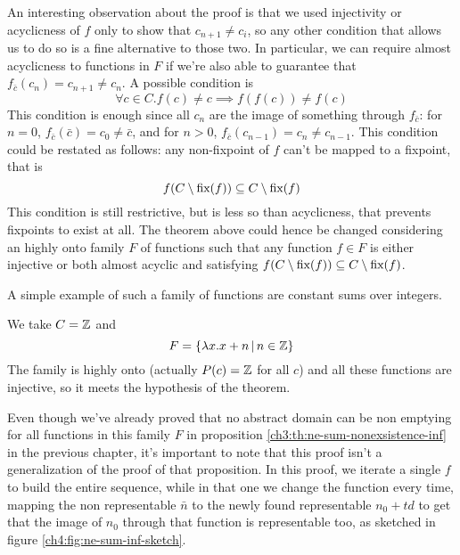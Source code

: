 An interesting observation about the proof is that we used injectivity or acyclicness of $f$ only to show that $c_{n+1} \neq c_i$, so any other condition that allows us to do so is a fine alternative to those two. In particular, we can require almost acyclicness to functions in $F$ if we're also able to guarantee that $f_{\bar{c}}(c_n) = c_{n+1} \neq c_n$. A possible condition is
\[
\forall c \in C. f(c) \neq c \implies f(f(c)) \neq f(c)
\]
This condition is enough since all $c_n$ are the image of something through $f_{\bar{c}}$: for $n = 0$, $f_{\bar{c}}(\bar{c})= c_0 \neq \bar{c}$, and for $n > 0$, $f_{\bar{c}}(c_{n-1}) = c_n \neq c_{n-1}$.
This condition could be restated as follows: any non-fixpoint of $f$ can't be mapped to a fixpoint, that is
\[
f(C \setminus \text{fix}(f)) \subseteq C \setminus \text{fix}(f)
\]
This condition is still restrictive, but is less so than acyclicness, that prevents fixpoints to exist at all.
The theorem above could hence be changed considering an highly onto family $F$ of functions such that any function $f \in F$ is either injective or both almost acyclic and satisfying $f(C \setminus \text{fix}(f)) \subseteq C \setminus \text{fix}(f)$.

A simple example of such a family of functions are constant sums over integers.
\begin{example}
We take $C = \mathbb{Z}$ and
\[
F = \{ \lambda x. x + n \,\vert\, n \in \mathbb{Z} \}
\]
The family is highly onto (actually $P(c) = \mathbb{Z}$ for all $c$) and all these functions are injective, so it meets the hypothesis of the theorem.
\end{example}

Even though we've already proved that no abstract domain can be non emptying for all functions in this family $F$ in proposition \ref{ch3:th:ne-sum-nonexsistence-inf} in the previous chapter, it's important to note that this proof isn't a generalization of the proof of that proposition. In this proof, we iterate a single $f$ to build the entire sequence, while in that one we change the function every time, mapping the non representable $\bar{n}$ to the newly found representable $n_0 + t d$ to get that the image of $n_0$ through that function is representable too, as sketched in figure \ref{ch4:fig:ne-sum-inf-sketch}.

